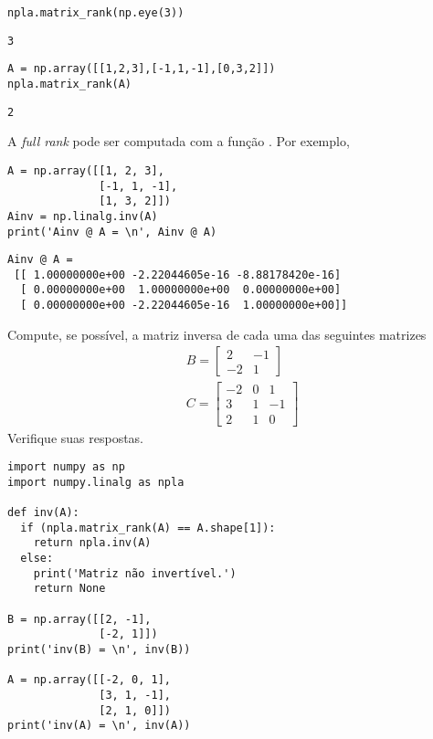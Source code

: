 \begin{lstlisting}
npla.matrix_rank(np.eye(3))
\end{lstlisting}

\begin{verbatim}
3
\end{verbatim}

\begin{lstlisting}
A = np.array([[1,2,3],[-1,1,-1],[0,3,2]])
npla.matrix_rank(A)
\end{lstlisting}

\begin{verbatim}
2
\end{verbatim}


A  \textit{full rank} pode ser computada com a função \hl{\PYTHONnumpyDOTlinalgDOTinv}. Por exemplo,

\begin{lstlisting}
A = np.array([[1, 2, 3],
              [-1, 1, -1],
              [1, 3, 2]])
Ainv = np.linalg.inv(A)
print('Ainv @ A = \n', Ainv @ A)
\end{lstlisting}


\begin{verbatim}
Ainv @ A = 
 [[ 1.00000000e+00 -2.22044605e-16 -8.88178420e-16]
  [ 0.00000000e+00  1.00000000e+00  0.00000000e+00]
  [ 0.00000000e+00 -2.22044605e-16  1.00000000e+00]]
\end{verbatim}

\begin{exer}
  Compute, se possível, a matriz inversa de cada uma das seguintes matrizes
  \begin{align}
    & B =
    \begin{bmatrix}
      2 & -1\\
      -2 & 1
    \end{bmatrix}\\
    & C =
    \begin{bmatrix}
      -2 & 0 & 1\\
      3 & 1 & -1\\
      2 & 1 & 0
    \end{bmatrix}
  \end{align}
  Verifique suas respostas.
\end{exer}
\begin{resp}
  
\begin{lstlisting}
import numpy as np
import numpy.linalg as npla

def inv(A):
  if (npla.matrix_rank(A) == A.shape[1]):
    return npla.inv(A)
  else:
    print('Matriz não invertível.')
    return None

B = np.array([[2, -1],
              [-2, 1]])
print('inv(B) = \n', inv(B))

A = np.array([[-2, 0, 1],
              [3, 1, -1],
              [2, 1, 0]])
print('inv(A) = \n', inv(A))  
\end{lstlisting}

\end{resp}


